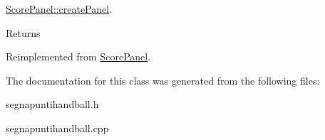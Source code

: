\mbox{\hyperlink{classScorePanel_aae4f1b7b8ee1afc61ac53105f8657fdb}{Score\+Panel\+::create\+Panel}}. 

\begin{DoxyReturn}{Returns}

\end{DoxyReturn}


Reimplemented from \mbox{\hyperlink{classScorePanel_aae4f1b7b8ee1afc61ac53105f8657fdb}{Score\+Panel}}.



The documentation for this class was generated from the following files\+:\begin{DoxyCompactItemize}
\item 
segnapuntihandball.\+h\item 
segnapuntihandball.\+cpp\end{DoxyCompactItemize}
